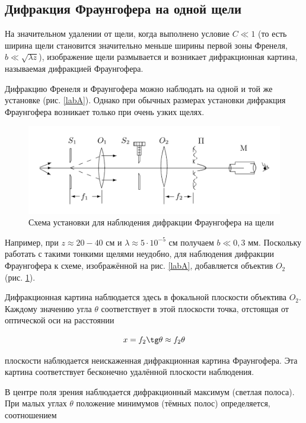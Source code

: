 \documentclass[a4paper,12pt]{article}
\begin{document}
\subsection{Дифракция Фраунгофера на одной щели}

На значительном удалении от щели, когда выполнено условие $ C \ll 1 $
(то есть ширина щели становится значительно меньше ширины первой
зоны Френеля, $ b \ll \sqrt{\lambda z} $), изображение щели размывается и возникает
дифракционная картина, называемая дифракцией Фраунгофера.

Дифракцию Френеля и Фраунгофера можно наблюдать на одной
и той же установке (рис. \ref{labA}). Однако при обычных размерах установки дифракция Фраунгофера возникает только при очень узких щелях.

\begin{figure}[H]
	\centering
	\includegraphics[scale=0.7]{Фраунгофер.png}
	\caption{Схема установки для наблюдения дифракции Фраунгофера на щели}
	\label{labB}
\end{figure}

Например, при $ z \approx  20-40 $  см и $  \lambda \approx 5 \cdot 10^{-5}  $   см получаем $  b \ll 0,3 $ мм. Поскольку работать с такими тонкими щелями неудобно, для наблюдения дифракции Фраунгофера к схеме, изображённой на рис. \ref{labA}, добавляется объектив $ O_2  $ (рис. \ref{labB}).

Дифракционная картина наблюдается здесь в фокальной плоскости
объектива $ O_2 $. Каждому значению угла $ \theta $ соответствует в этой плоскости точка, отстоящая от оптической оси на расстоянии

\begin{equation}\label{x}
x = f_2 \tg \theta \approx f_2 \theta
\end{equation}


плоскости наблюдается неискаженная дифракционная картина Фраунгофера. Эта картина соответствует бесконечно удалённой плоскости
наблюдения.

В центре поля зрения наблюдается дифракционный максимум (светлая полоса). При малых углах $ \theta $ положение минимумов (тёмных полос)
определяется, соотношением
\end{document}
